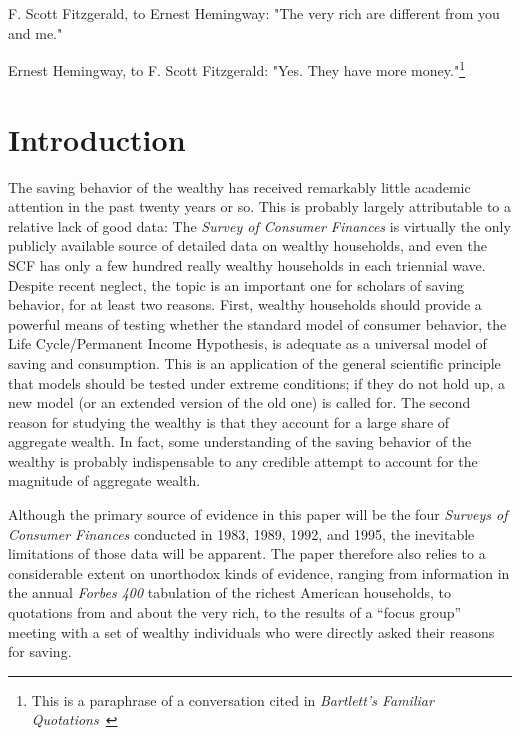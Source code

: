 \documentclass[titlepage,12pt]{article}
\begin{document}
\baselineskip 22pt


\noindent F. Scott Fitzgerald, to Ernest Hemingway: \newline
\indent	"The very rich are different from you and me."
	

\noindent Ernest Hemingway, to F. Scott Fitzgerald: \newline \indent 
"Yes.  They have more money."\footnote{This is a paraphrase of a 
conversation cited in {\it Bartlett's Familiar 
Quotations}~\cite{bartlett:quotes}}

\hypertarget{introduction}{}
\section{Introduction}

The saving behavior of the wealthy has received remarkably little 
academic attention in the past twenty years or so.  This is probably 
largely attributable to a relative lack of good data: The {\it Survey 
of Consumer Finances} is virtually the only publicly available source 
of detailed data on wealthy households, and even the SCF has only a 
few hundred really wealthy households in each triennial wave.  Despite 
recent neglect, the topic is an important one for scholars of saving 
behavior, for at least two reasons.  First, wealthy households should 
provide a powerful means of testing whether the standard model of 
consumer behavior, the Life Cycle/Permanent Income Hypothesis, is 
adequate as a universal model of saving and consumption.  This is an 
application of the general scientific principle that models should be 
tested under extreme conditions; if they do not hold up, a new model 
(or an extended version of the old one) is called for.  The second 
reason for studying the wealthy is that they account for a large share 
of aggregate wealth.  In fact, some understanding of the saving 
behavior of the wealthy is probably indispensable to any credible 
attempt to account for the magnitude of aggregate wealth.

Although the primary source of evidence in this paper will be the four 
{\it Surveys of Consumer Finances} conducted in 1983, 1989, 1992, and 
1995, the inevitable limitations of those data will be apparent.  The 
paper therefore also relies to a considerable extent on unorthodox 
kinds of evidence, ranging from information in the annual {\it Forbes 
400} tabulation of the richest American households, to quotations from and 
about the very rich, to the results of a ``focus group'' meeting with 
a set of wealthy individuals who were directly asked their reasons for 
saving.
\end{document}
